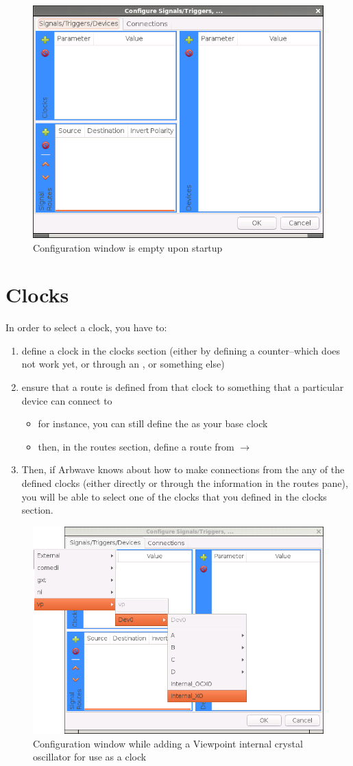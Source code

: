 \begin{figure}[ht]
  \centerline{\includegraphics[width=.5\textwidth]{figures/empty}}
  \caption{Configuration window is empty upon startup}
  \label{fig:devcfg:empty}
\end{figure}



\section{Clocks}
In order to select a clock, you have to:
\begin{enumerate}
  \item define a clock in the clocks section (either by defining a
    counter--which does not work yet, or through an , or something
    else)
  \item ensure that a route is defined from that clock to something that a
    particular device can connect to
    \begin{itemize}
      \item for instance, you can still define the  as your base
      clock
      \item then, in the routes section, define a route from
       $\rightarrow$ 
    \end{itemize}
  \item Then, if Arbwave knows about how to make connections from the any of the
    defined clocks (either directly or through the information in the routes
    pane), you will be able to select one of the clocks that you defined in the
    clocks section.
\end{enumerate}

\begin{figure}[ht]
  \centerline{\includegraphics[width=.5\textwidth]{figures/add-clock-vp-XO}}
  \caption{Configuration window while adding a Viewpoint internal crystal
  oscillator for use as a clock}
  \label{fig:devcfg:add-clock-vp-XO}
\end{figure}

